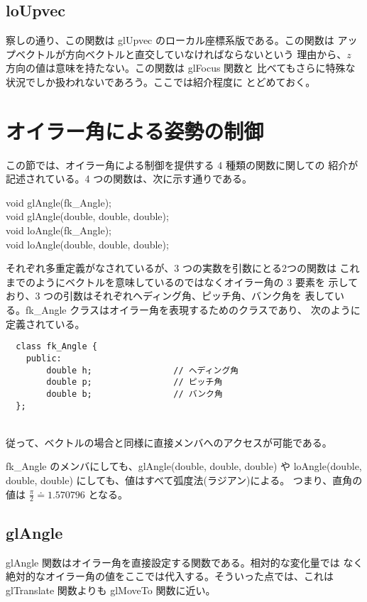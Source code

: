 \subsection{loUpvec}
察しの通り、この関数は glUpvec のローカル座標系版である。この関数は
アップベクトルが方向ベクトルと直交していなければならないという
理由から、\(z\) 方向の値は意味を持たない。この関数は glFocus 関数と
比べてもさらに特殊な状況でしか扱われないであろう。ここでは紹介程度に
とどめておく。
\section{オイラー角による姿勢の制御}
この節では、オイラー角による制御を提供する 4 種類の関数に関しての
紹介が記述されている。4 つの関数は、次に示す通りである。
\begin{description}
\item[void glAngle(fk\_Angle);]
\item[void glAngle(double, double, double);]
\item[void loAngle(fk\_Angle);]
\item[void loAngle(double, double, double);]
\end{description}
それぞれ多重定義がなされているが、3 つの実数を引数にとる2つの関数は
これまでのようにベクトルを意味しているのではなくオイラー角の 3 要素を
示しており、3 つの引数はそれぞれヘディング角、ピッチ角、バンク角を
表している。fk\_Angle クラスはオイラー角を表現するためのクラスであり、
次のように定義されている。
\\
\begin{screen}
\begin{verbatim}
  class fk_Angle {
    public:
        double h;                // ヘディング角
        double p;                // ピッチ角
        double b;                // バンク角
  };
\end{verbatim}
\end{screen}
~ \\
従って、ベクトルの場合と同様に直接メンバへのアクセスが可能である。

fk\_Angle のメンバにしても、glAngle(double, double, double) や
loAngle(double, double, double) にしても、値はすべて弧度法(ラジアン)による。
つまり、直角の値は \(\frac{\pi}{2} \doteq 1.570796\) となる。
\subsection{glAngle}
glAngle 関数はオイラー角を直接設定する関数である。相対的な変化量では
なく絶対的なオイラー角の値をここでは代入する。そういった点では、これは
glTranslate 関数よりも glMoveTo 関数に近い。

